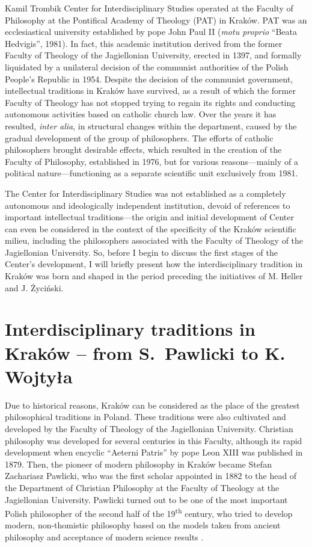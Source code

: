\begin{artengenv}{Kamil Trombik}
Center for Interdisciplinary Studies operated at the Faculty of Philosophy at the Pontifical Academy of Theology (PAT)
in Kraków. PAT was an ecclesiastical university established by pope John Paul II (\textit{motu proprio} ``Beata
Hedvigis'', 1981). In fact, this academic institution derived from the former Faculty of Theology of the Jagiellonian
University, erected in 1397, and formally liquidated by a unilateral decision of the communist authorities of the
Polish People's Republic in 1954. Despite the decision of the communist government, intellectual traditions in Kraków
have survived, as a result of which the former Faculty of Theology has not stopped trying to regain its rights and
conducting autonomous activities based on catholic church law. Over the years it has resulted, \textit{inter alia}, in
structural changes within the department, caused by the gradual development of the group of philosophers. The efforts
of catholic philosophers brought desirable effects, which resulted in the creation of the Faculty of Philosophy,
established in 1976, but for various reasons---mainly of a political nature---functioning as a separate scientific unit
exclusively from 1981.

The Center for Interdisciplinary Studies was not established as a completely autonomous and ideologically independent
institution, devoid of references to important intellectual traditions---the origin and initial development of Center can
even be considered in the context of the specificity of the Kraków scientific milieu, including the philosophers
associated with the Faculty of Theology of the Jagiellonian University. So, before I begin to discuss the first stages
of the Center's development, I will briefly present how the interdisciplinary tradition in Kraków was born and shaped
in the period preceding the initiatives of M. Heller and J. Życiński.

\section{Interdisciplinary traditions in Kraków -- from S.~Pawlicki to K. Wojtyła}

Due to historical reasons, Kraków can be considered as the place of the greatest philosophical
traditions in Poland. These traditions were also cultivated and developed by the Faculty of Theology of the
Jagiellonian University. Christian philosophy was developed for several centuries in this Faculty, although its rapid
development when encyclic ``Aeterni Patris'' by pope Leon XIII was published in 1879. Then, the pioneer of modern
philosophy in Kraków became Stefan Zachariasz Pawlicki, who was the first scholar appointed in 1882 to the head of the
Department of Christian Philosophy at the Faculty of Theology at the Jagiellonian University. Pawlicki turned out to be
one of the most important Polish philosopher of the second half of the
19\textsuperscript{th} century, who tried to develop modern, non-thomistic
philosophy based on the models taken from ancient philosophy and acceptance of modern science results
\parencite{polak_rola_2017}.


\end{artengenv}

